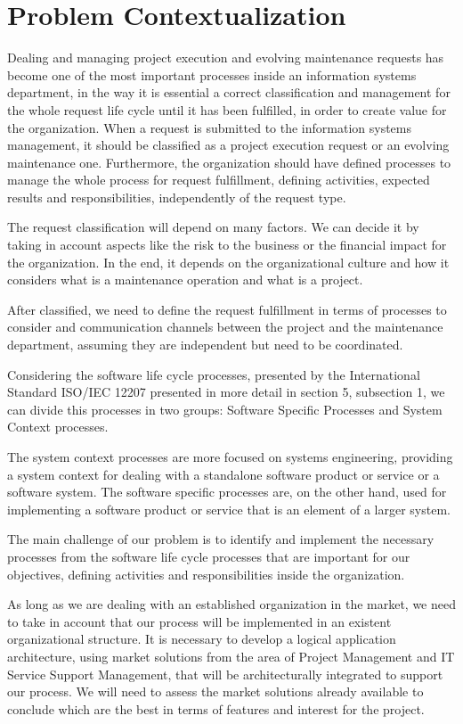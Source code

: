 
% 
% 

\section{Problem Contextualization}


Dealing and managing project execution and evolving maintenance requests has become one of the most important processes inside an information systems department, in the way it is essential a correct classification and management for the whole request life cycle until it has been fulfilled, in order to create value for the organization.
When a request is submitted to the information systems management, it should be classified as a project execution request or an evolving maintenance one. Furthermore, the organization should have defined processes to manage the whole process for request fulfillment, defining activities, expected results and responsibilities, independently of the request type.\par
The request classification will depend on many factors. We can decide it by taking in account aspects like the risk to the business or the financial impact for the organization. In the end, it depends on the organizational culture and how it considers what is a maintenance operation and what is a project.\par
After classified, we need to define the request fulfillment in terms of processes to consider and communication channels between the project and the maintenance department, assuming they are independent but need to be coordinated.\par
Considering the software life cycle processes, presented by the International Standard ISO/IEC 12207\cite{ISO12207} presented in more detail in section 5, subsection 1, we can divide this processes in two groups: Software Specific Processes and System Context processes.\par
The system context processes are more focused on systems engineering, providing a system context for dealing with a standalone software product or service or a software system. The software specific processes are, on the other hand, used for implementing a software product or service that is an element of a larger system. \par 
The main challenge of our problem is to identify and implement the necessary processes from the software life cycle processes that are important for our objectives, defining activities and responsibilities inside the organization.\par
As long as we are dealing with an established organization in the market, we need to take in account that our process will be implemented in an existent organizational structure. It is necessary to develop a logical application architecture, using market solutions from the area of Project Management and IT Service Support Management, that will be architecturally integrated to support our process. We will need to assess the market solutions already available to conclude which are the best in terms of features and interest for the project. 
